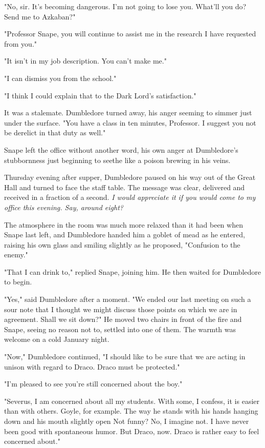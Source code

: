 "No, sir. It's becoming dangerous. I'm not going to lose you. What'll you do? Send me to Azkaban?"

"Professor Snape, you will continue to assist me in the research I have requested from you."

"It isn't in my job description. You can't make me."

"I can dismiss you from the school."

"I think I could explain that to the Dark Lord's satisfaction."

It was a stalemate. Dumbledore turned away, his anger seeming to simmer just under the surface. "You have a class in ten minutes, Professor. I suggest you not be derelict in that duty as well."

Snape left the office without another word, his own anger at Dumbledore's stubbornness just beginning to seethe like a poison brewing in his veins.

Thursday evening after supper, Dumbledore paused on his way out of the Great Hall and turned to face the staff table. The message was clear, delivered and received in a fraction of a second. \emph{I would appreciate it if you would come to my office this evening. Say, around eight?}

The atmosphere in the room was much more relaxed than it had been when Snape last left, and Dumbledore handed him a goblet of mead as he entered, raising his own glass and smiling slightly as he proposed, "Confusion to the enemy."

"That I can drink to," replied Snape, joining him. He then waited for Dumbledore to begin.

"Yes," said Dumbledore after a moment. "We ended our last meeting on such a sour note that I thought we might discuss those points on which we are in agreement. Shall we sit down?" He moved two chairs in front of the fire and Snape, seeing no reason not to, settled into one of them. The warmth was welcome on a cold January night.

"Now," Dumbledore continued, "I should like to be sure that we are acting in unison with regard to Draco. Draco must be protected."

"I'm pleased to see you're still concerned about the boy."

"Severus, I am concerned about all my students. With some, I confess, it is easier than with others. Goyle, for example. The way he stands with his hands hanging down and his mouth slightly open{\el} Not funny? No, I imagine not. I have never been good with spontaneous humor. But Draco, now. Draco is rather easy to feel concerned about."

